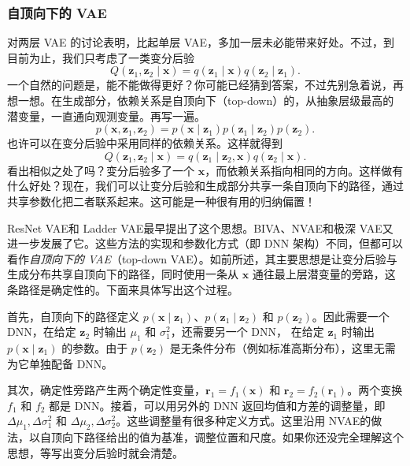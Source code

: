 \subsubsection{自顶向下的 VAE}
对两层 VAE 的讨论表明，比起单层 VAE，多加一层未必能带来好处。不过，到目前为止，我们只考虑了一类变分后验
\begin{equation}
Q(\mathbf{z}_1,\mathbf{z}_2\mid\mathbf{x})=q(\mathbf{z}_1\mid\mathbf{x})q(\mathbf{z}_2\mid\mathbf{z}_1).
\tag{5.83}\label{eq:05-83}
\end{equation}
一个自然的问题是，能不能做得更好？你可能已经猜到答案，不过先别急着说，再想一想。在生成部分，依赖关系是自顶向下（top-down）的，从抽象层级最高的潜变量，一直通向观测变量。再写一遍。
\begin{equation}
p(\mathbf{x},\mathbf{z}_1,\mathbf{z}_2)=p(\mathbf{x}\mid\mathbf{z}_1)p(\mathbf{z}_1\mid\mathbf{z}_2)p(\mathbf{z}_2).
\tag{5.84}\label{eq:05-84}
\end{equation}
也许可以在变分后验中采用同样的依赖关系。这样就得到
\begin{equation}
Q(\mathbf{z}_1,\mathbf{z}_2\mid\mathbf{x})=q(\mathbf{z}_1\mid\mathbf{z}_2,\mathbf{x})q(\mathbf{z}_2\mid\mathbf{x}).
\tag{5.85}\label{eq:05-85}
\end{equation}
看出相似之处了吗？变分后验多了一个 $\mathbf{x}$，而依赖关系指向相同的方向。这样做有什么好处？现在，我们可以让变分后验和生成部分共享一条自顶向下的路径，通过共享参数化把二者联系起来。这可能是一种很有用的归纳偏置！

ResNet VAE和 Ladder VAE最早提出了这个思想。BIVA、NVAE和极深 VAE又进一步发展了它。这些方法的实现和参数化方式（即 DNN 架构）不同，但都可以看作\emph{自顶向下的 VAE}（top-down VAE）。如前所述，其主要思想是让变分后验与生成分布共享自顶向下的路径，同时使用一条从 $\mathbf{x}$ 通往最上层潜变量的旁路，这条路径是确定性的。下面来具体写出这个过程。

首先，自顶向下的路径定义 $p(\mathbf{x}\mid\mathbf{z}_1)$、$p(\mathbf{z}_1\mid\mathbf{z}_2)$ 和 $p(\mathbf{z}_2)$。因此需要一个 DNN，在给定 $\mathbf{z}_2$ 时输出 $\mu_1$ 和 $\sigma_1^2$，还需要另一个 DNN，
在给定 $\mathbf{z}_1$ 时输出 $p(\mathbf{x}\mid\mathbf{z}_1)$ 的参数。由于 $p(\mathbf{z}_2)$ 是无条件分布（例如标准高斯分布），这里无需为它单独配备 DNN。

其次，确定性旁路产生两个确定性变量，$\mathbf{r}_1=f_1(\mathbf{x})$ 和 $\mathbf{r}_2=f_2(\mathbf{r}_1)$。两个变换 $f_1$ 和 $f_2$ 都是 DNN。接着，可以用另外的 DNN 返回均值和方差的调整量，即 $\Delta\mu_1,\Delta\sigma_1^2$ 和 $\Delta\mu_2,\Delta\sigma_2^2$。这些调整量有很多种定义方式。这里沿用 NVAE的做法，以自顶向下路径给出的值为基准，调整位置和尺度。如果你还没完全理解这个思想，等写出变分后验时就会清楚。

